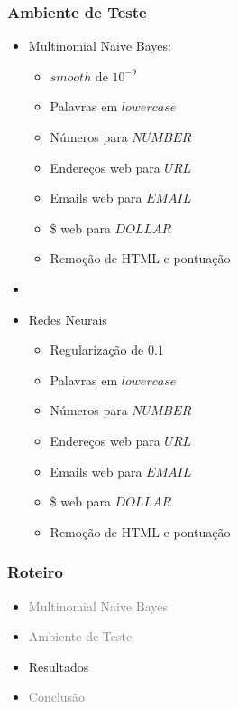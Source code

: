 \documentclass[10pt]{beamer}
\begin{document}
\begin{frame}[fragile]
  \frametitle{Ambiente de Teste}

  \begin{itemize}
    \item Multinomial Naive Bayes:
    \begin{itemize}
      \item[-] $smooth$ de $10^{-9}$
      \item[-] Palavras em $lowercase$
      \item[-] Números para $NUMBER$
      \item[-] Endereços web para $URL$
      \item[-] Emails web para $EMAIL$
      \item[-] \$ web para $DOLLAR$
      \item[-] Remoção de HTML e pontuação
    \end{itemize}

    \item[\ ] \ 
  \end{itemize}


  \begin{itemize}
    \item Redes Neurais
    \begin{itemize}
      \item[-] Regularização de $0.1$
      \item[-] Palavras em $lowercase$
      \item[-] Números para $NUMBER$
      \item[-] Endereços web para $URL$
      \item[-] Emails web para $EMAIL$
      \item[-] \$ web para $DOLLAR$
      \item[-] Remoção de HTML e pontuação
    \end{itemize}
  \end{itemize}



\end{frame}


\begin{frame}
  \frametitle{Roteiro}

  \begin{itemize}

    \item[\color{gray}{$\bullet$}] \textcolor{gray}{Multinomial Naive Bayes}

    \item[\color{gray}{$\bullet$}] \textcolor{gray}{Ambiente de Teste}

    \item Resultados

    \item[\color{gray}{$\bullet$}] \textcolor{gray}{Conclusão}

  \end{itemize}

\end{frame}
\end{document}
